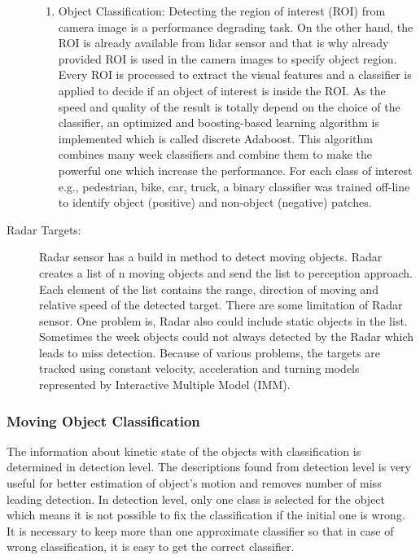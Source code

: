 \begin{description}
\begin{enumerate}
        \item{Object Classification:} Detecting the region of interest (ROI) from camera image is a performance degrading task. On the other hand, the ROI is already available from lidar sensor and that is why already provided ROI is used in the camera images to specify object region. Every ROI is processed to extract the visual features and a classifier is applied to decide if an object of interest is inside the ROI. As the speed and quality of the result is totally depend on the choice of the classifier, an optimized and boosting-based learning algorithm is implemented which is called discrete Adaboost\cite{Chavez_Garcia_2016}. This algorithm combines many week classifiers and combine them to make the powerful one which increase the performance. For each class of interest e.g., pedestrian, bike, car, truck, a binary classifier was trained off-line to identify object (positive) and non-object (negative) patches\cite{Chavez_Garcia_2016}.
    \end{enumerate}
    \item[Radar Targets:] Radar sensor has a build in method to detect moving objects. Radar creates a list of n moving objects and send the list to perception approach. Each element of the list contains the range, direction of moving and relative speed of the detected target. There are some limitation of Radar sensor. One problem is, Radar also could include static objects in the list. Sometimes the week objects could not always detected by the Radar which leads to miss detection. Because of various problems, the targets are tracked using constant velocity, acceleration and turning models represented by Interactive Multiple Model (IMM).
\end{description}

\subsubsection{Moving Object Classification}
The information about kinetic state of the objects with classification is determined in detection level. The descriptions found from detection level is very useful for better estimation of object's motion and removes number of miss leading detection. In detection level, only one class is selected for the object which means it is not possible to fix the classification if the initial one is wrong. It is necessary to keep more than one approximate classifier so that in case of wrong classification, it is easy to get the correct classifier.

